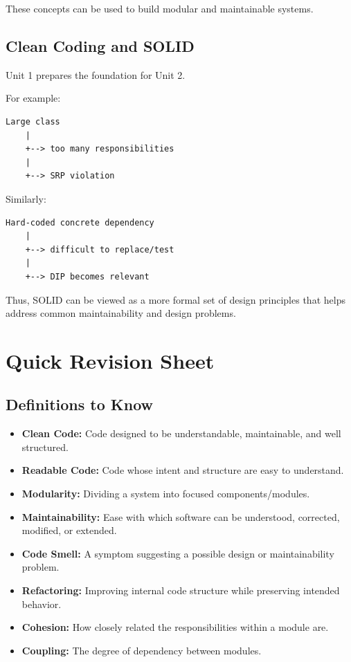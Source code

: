 \documentclass[11pt,a4paper]{article}
\begin{document}
These concepts can be used to build modular and maintainable systems.

\subsection{Clean Coding and SOLID}

Unit 1 prepares the foundation for Unit 2.

For example:

\begin{verbatim}
Large class
    |
    +--> too many responsibilities
    |
    +--> SRP violation
\end{verbatim}

Similarly:

\begin{verbatim}
Hard-coded concrete dependency
    |
    +--> difficult to replace/test
    |
    +--> DIP becomes relevant
\end{verbatim}

Thus, SOLID can be viewed as a more formal set of design principles that helps
address common maintainability and design problems.

\section{Quick Revision Sheet}

\subsection{Definitions to Know}

\begin{itemize}
    \item \textbf{Clean Code:} Code designed to be understandable, maintainable,
    and well structured.
    \item \textbf{Readable Code:} Code whose intent and structure are easy to understand.
    \item \textbf{Modularity:} Dividing a system into focused components/modules.
    \item \textbf{Maintainability:} Ease with which software can be understood,
    corrected, modified, or extended.
    \item \textbf{Code Smell:} A symptom suggesting a possible design or
    maintainability problem.
    \item \textbf{Refactoring:} Improving internal code structure while preserving
    intended behavior.
    \item \textbf{Cohesion:} How closely related the responsibilities within a
    module are.
    \item \textbf{Coupling:} The degree of dependency between modules.
\end{itemize}
\end{document}
